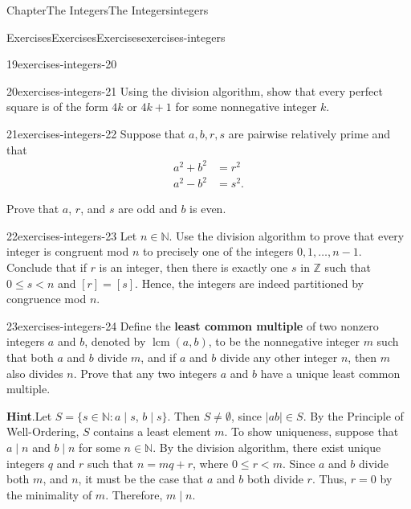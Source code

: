 \documentclass[oneside,10pt,]{book}
\newcommand{\blocktitlefont}{\relax}
\newcommand{\terminology}[1]{\textbf{#1}}
\numberwithin{equation}{section}
\newcommand{\lcm}{\operatorname{lcm}}
\newcommand{\lt}{<}
\begin{document}
\begin{chapterptx}{Chapter}{The Integers}{}{The Integers}{}{}{integers}
\begin{exercises-section}{Exercises}{Exercises}{}{Exercises}{}{}{exercises-integers}
\begin{divisionexercise}{19}{}{}{exercises-integers-20}
\end{divisionexercise}%
\begin{divisionexercise}{20}{}{}{exercises-integers-21}%
Using the division algorithm, show that every perfect square is of the form \(4k\) or \(4k + 1\) for some nonnegative integer \(k\).%
\end{divisionexercise}%
\begin{divisionexercise}{21}{}{}{exercises-integers-22}%
Suppose that \(a, b, r, s\) are pairwise relatively prime and that%
\begin{align*}
a^2 + b^2 & = r^2\\
a^2 - b^2 & = s^2.
\end{align*}
%
\par
Prove that \(a\), \(r\), and \(s\) are odd and \(b\) is even.%
\end{divisionexercise}%
\begin{divisionexercise}{22}{}{}{exercises-integers-23}%
Let \(n \in {\mathbb N}\).  Use the division algorithm to prove that every integer is congruent mod \(n\) to precisely one of the integers \(0, 1, \ldots, n-1\). Conclude that if \(r\) is an integer, then there is exactly one \(s\) in \({\mathbb Z}\) such that \(0 \leq s \lt n\) and \([r] = [s]\). Hence, the integers are indeed partitioned by congruence mod \(n\).%
\end{divisionexercise}%
\begin{divisionexercise}{23}{}{}{exercises-integers-24}%
Define the \terminology{least common multiple} of two nonzero integers \(a\) and \(b\), denoted by \(\lcm(a,b)\), to be the nonnegative integer \(m\) such that both \(a\) and \(b\) divide \(m\), and if \(a\) and \(b\)  divide any other integer \(n\), then \(m\) also divides \(n\). \label{exercises-integers-24-1-1-14} Prove that any two integers \(a\) and \(b\) have a unique least common multiple.%
\par\smallskip%
\noindent\textbf{\blocktitlefont Hint}.\hypertarget{exercises-integers-24-2}{}\quad{}Let \(S = \{s \in {\mathbb N} : a \mid s\), \(b \mid s \}\). Then \(S \neq \emptyset\), since \(|ab| \in S\). By the Principle of Well-Ordering, \(S\) contains a least element \(m\). To show uniqueness, suppose that \(a \mid n\) and \(b \mid n\) for some \(n \in {\mathbb N}\). By the division algorithm, there exist unique integers \(q\) and \(r\) such that \(n = mq + r\), where \(0 \leq r \lt m\). Since \(a\) and \(b\) divide both \(m\), and \(n\), it must be the case that  \(a\) and \(b\) both divide \(r\).  Thus, \(r = 0\) by the minimality of \(m\). Therefore, \(m \mid n\).%

\end{divisionexercise}
\end{exercises-section}
\end{chapterptx}
\end{document}

